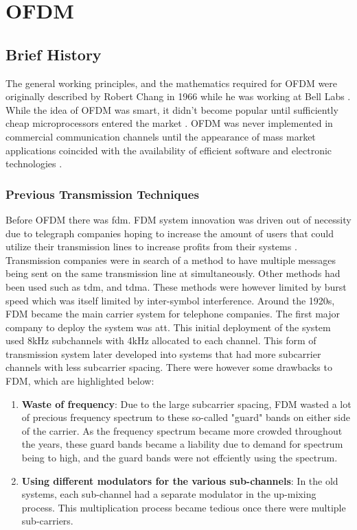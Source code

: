 \documentclass[class=report,11pt,crop=false]{standalone}
\begin{document}
\section{OFDM}
\subsection{Brief History}
The general working principles, and the mathematics required for OFDM were originally described by Robert Chang in 1966 while he was working at Bell Labs \cite{computer_science_lessons_ofdm}. While the idea of OFDM was smart, it didn't become popular until sufficiently cheap microprocessors entered the market \cite{computer_science_lessons_ofdm}. OFDM was never implemented in commercial communication channels until the appearance of mass market applications coincided with the availability of efficient software and electronic technologies \cite{weinstein_history_2009}.

\subsubsection{Previous Transmission Techniques}
Before OFDM there was \gls{fdm}. FDM system innovation was driven out of necessity due to telegraph companies hoping to increase the amount of users that could utilize their transmission lines to increase profits from their systems \cite{weinstein_history_2009}. Transmission companies were in search of a method to have multiple messages being sent on the same transmission line at simultaneously. Other methods had been used such as \gls{tdm}, and \gls{tdma}. These methods were however limited by burst speed which was itself limited by inter-symbol interference. Around the 1920s, FDM became the main carrier system for telephone companies. The first major company to deploy the system was \gls{att}. This initial deployment of the system used 8kHz subchannels with 4kHz allocated to each channel. This form of transmission system later developed into systems that had more subcarrier channels with less subcarrier spacing. There were however some drawbacks to FDM, which are highlighted below:

\begin{enumerate}
    \item \textbf{Waste of frequency}: Due to the large subcarrier spacing, FDM wasted a lot of precious frequency spectrum to these so-called "guard" bands on either side of the carrier. As the frequency spectrum became more crowded throughout the years, these guard bands became a liability due to demand for spectrum being to high, and the guard bands were not effciently using the spectrum.
    \item \textbf{Using different modulators for the various sub-channels}: In the old systems, each sub-channel had a separate modulator in the up-mixing process. This multiplication process became tedious once there were multiple sub-carriers.
\end{enumerate}
\end{document}
